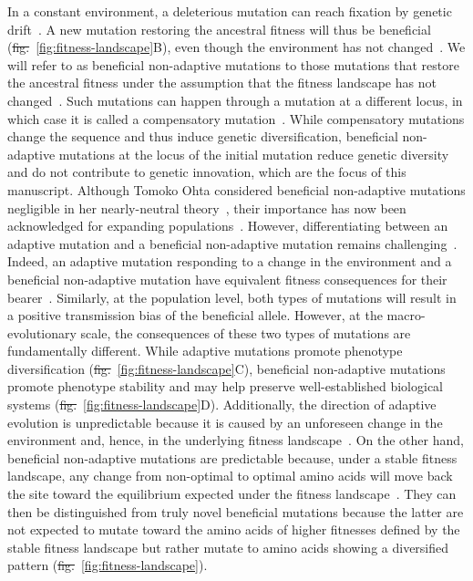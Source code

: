\documentclass[10pt,letterpaper]{article}
\providecommand{\DIFaddtex}[1]{{\protect\color{blue}\uwave{#1}}} %
\providecommand{\DIFdeltex}[1]{{\protect\color{red}\sout{#1}}}                      %
\providecommand{\DIFaddbegin}{} %
\providecommand{\DIFaddend}{} %
\providecommand{\DIFdelbegin}{} %
\providecommand{\DIFdelend}{} %
\providecommand{\DIFadd}[1]{\texorpdfstring{\DIFaddtex{#1}}{#1}} %
\providecommand{\DIFdel}[1]{\texorpdfstring{\DIFdeltex{#1}}{}} %
\newcommand{\DIFscaledelfig}{0.5}
\newlength{\DIFdelgraphicswidth} %
\newlength{\DIFdelgraphicsheight} %
\newcommand{\DIFaddincludegraphics}[2][]{{\color{blue}\fbox{\DIFOincludegraphics[#1]{#2}}}} %
\newcommand{\DIFdelincludegraphics}[2][]{%
\sbox{\DIFdelgraphicsbox}{\DIFOincludegraphics[#1]{#2}}%
\settoboxwidth{\DIFdelgraphicswidth}{\DIFdelgraphicsbox} %
\settoboxtotalheight{\DIFdelgraphicsheight}{\DIFdelgraphicsbox} %
\scalebox{\DIFscaledelfig}{%
\parbox[b]{\DIFdelgraphicswidth}{\usebox{\DIFdelgraphicsbox}\\[-\baselineskip] \rule{\DIFdelgraphicswidth}{0em}}\llap{\resizebox{\DIFdelgraphicswidth}{\DIFdelgraphicsheight}{%
\setlength{\unitlength}{\DIFdelgraphicswidth}%
\begin{picture}(1,1)%
\thicklines\linethickness{2pt} %
{\color[rgb]{1,0,0}\put(0,0){\framebox(1,1){}}}%
{\color[rgb]{1,0,0}\put(0,0){\line( 1,1){1}}}%
{\color[rgb]{1,0,0}\put(0,1){\line(1,-1){1}}}%
\end{picture}%
}\hspace*{3pt}}} %
} %
\DeclareRobustCommand{\DIFaddbegin}{\DIFOaddbegin \let\includegraphics\DIFaddincludegraphics} %
\DeclareRobustCommand{\DIFaddend}{\DIFOaddend \let\includegraphics\DIFOincludegraphics} %
\DeclareRobustCommand{\DIFdelbegin}{\DIFOdelbegin \let\includegraphics\DIFdelincludegraphics} %
\DeclareRobustCommand{\DIFdelend}{\DIFOaddend \let\includegraphics\DIFOincludegraphics} %
\begin{document}
In a constant environment, a deleterious mutation can reach fixation by genetic drift~\cite{ohta_nearly_1992}.
A new mutation restoring the ancestral fitness will thus be beneficial (\DIFdelbegin \DIFdel{fig.}\DIFdelend \DIFaddbegin \DIFadd{Fig}\DIFaddend ~\ref{fig:fitness-landscape}B), even though the environment has not changed~\cite{gillespie_ohta_1995, hartl_compensatory_1996, sella_application_2005, mustonen_fitness_2009, cvijovic_fate_2015}.
We will refer to as beneficial non-adaptive mutations to those mutations that restore the ancestral fitness under the assumption that the fitness landscape has not changed~\cite{piganeau_estimating_2003, charlesworth_other_2007}.
Such mutations can happen through a mutation at a different locus, in which case it is called a compensatory mutation~\cite{hartl_compensatory_1996, mustonen_fitness_2009}.
While compensatory mutations change the sequence and thus induce genetic diversification, beneficial non-adaptive mutations at the locus of the initial mutation reduce genetic diversity and do not contribute to genetic innovation, which are the focus of this manuscript.
Although Tomoko Ohta considered beneficial non-adaptive mutations negligible in her nearly-neutral theory~\cite{ohta_nearly_1992}, their importance has now been acknowledged for expanding populations~\cite{charlesworth_other_2007}.
However, differentiating between an adaptive mutation and a beneficial non-adaptive mutation remains challenging~\cite{chi_detecting_2020}.
Indeed, an adaptive mutation responding to a change in the environment and a beneficial non-adaptive mutation have equivalent fitness consequences for their bearer~\cite{charlesworth_other_2007}.
Similarly, at the population level, both types of mutations will result in a positive transmission bias of the beneficial allele.
However, at the macro-evolutionary scale, the consequences of these two types of mutations are fundamentally different.
While adaptive mutations promote phenotype diversification (\DIFdelbegin \DIFdel{fig.}\DIFdelend \DIFaddbegin \DIFadd{Fig}\DIFaddend ~\ref{fig:fitness-landscape}C), beneficial non-adaptive mutations promote phenotype stability and may help preserve well-established biological systems (\DIFdelbegin \DIFdel{fig.}\DIFdelend \DIFaddbegin \DIFadd{Fig}\DIFaddend ~\ref{fig:fitness-landscape}D).
Additionally, the direction of adaptive evolution is unpredictable because it is caused by an unforeseen change in the environment and, hence, in the underlying fitness landscape~\cite{bazykin_changing_2015}.
On the other hand, beneficial non-adaptive mutations are predictable because, under a stable fitness landscape, any change from non-optimal to optimal amino acids will move back the site toward the equilibrium expected under the fitness landscape~\cite{moses_inferring_2009, fischer_germline_2011, chen_hunting_2021}.
They can then be distinguished from truly novel beneficial mutations because the latter are not expected to mutate toward the amino acids of higher fitnesses defined by the stable fitness landscape but rather mutate to amino acids showing a diversified pattern (\DIFdelbegin \DIFdel{fig.}\DIFdelend \DIFaddbegin \DIFadd{Fig}\DIFaddend ~\ref{fig:fitness-landscape}).
\end{document}
